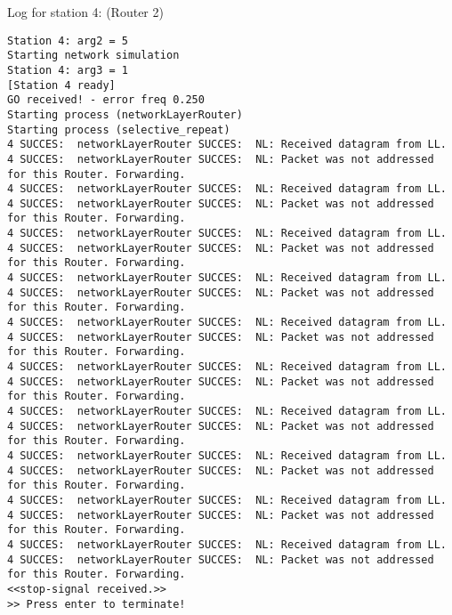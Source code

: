 Log for station 4: (Router 2)
\begin{lstlisting}[breaklines=true]
Station 4: arg2 = 5
Starting network simulation
Station 4: arg3 = 1
[Station 4 ready]
GO received! - error freq 0.250
Starting process (networkLayerRouter)
Starting process (selective_repeat)
4 SUCCES:  networkLayerRouter SUCCES:  NL: Received datagram from LL.
4 SUCCES:  networkLayerRouter SUCCES:  NL: Packet was not addressed for this Router. Forwarding.
4 SUCCES:  networkLayerRouter SUCCES:  NL: Received datagram from LL.
4 SUCCES:  networkLayerRouter SUCCES:  NL: Packet was not addressed for this Router. Forwarding.
4 SUCCES:  networkLayerRouter SUCCES:  NL: Received datagram from LL.
4 SUCCES:  networkLayerRouter SUCCES:  NL: Packet was not addressed for this Router. Forwarding.
4 SUCCES:  networkLayerRouter SUCCES:  NL: Received datagram from LL.
4 SUCCES:  networkLayerRouter SUCCES:  NL: Packet was not addressed for this Router. Forwarding.
4 SUCCES:  networkLayerRouter SUCCES:  NL: Received datagram from LL.
4 SUCCES:  networkLayerRouter SUCCES:  NL: Packet was not addressed for this Router. Forwarding.
4 SUCCES:  networkLayerRouter SUCCES:  NL: Received datagram from LL.
4 SUCCES:  networkLayerRouter SUCCES:  NL: Packet was not addressed for this Router. Forwarding.
4 SUCCES:  networkLayerRouter SUCCES:  NL: Received datagram from LL.
4 SUCCES:  networkLayerRouter SUCCES:  NL: Packet was not addressed for this Router. Forwarding.
4 SUCCES:  networkLayerRouter SUCCES:  NL: Received datagram from LL.
4 SUCCES:  networkLayerRouter SUCCES:  NL: Packet was not addressed for this Router. Forwarding.
4 SUCCES:  networkLayerRouter SUCCES:  NL: Received datagram from LL.
4 SUCCES:  networkLayerRouter SUCCES:  NL: Packet was not addressed for this Router. Forwarding.
4 SUCCES:  networkLayerRouter SUCCES:  NL: Received datagram from LL.
4 SUCCES:  networkLayerRouter SUCCES:  NL: Packet was not addressed for this Router. Forwarding.
<<stop-signal received.>>
>> Press enter to terminate!
\end{lstlisting}

